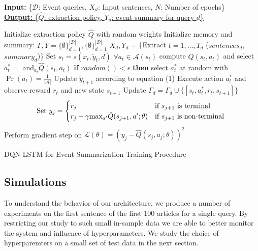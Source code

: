 \documentclass[12pt]{article}
\begin{document}
\begin{algorithm}
    \textbf{Input:} { \rm  \{$\mathcal{D}$: Event queries, $X_d$: Input sentences, $N$: Number of epochs\} } \\
    \underline{\textbf{Output:} \rm \{$\hat{Q}$: extraction policy, $\tilde{Y}_d$: event summary for query $d$\} }
\begin{algorithmic}[1]
\vspace{-0.5cm}
\STATE \rm Initialize extraction policy $\hat{Q}$ with random weights
\STATE \rm Initialize memory and summary: $\Gamma, \tilde{Y} =  \{\emptyset \}^{\mathcal{|D|}}_{d=1},  \{\emptyset \}^{\mathcal{|D|}}_{d=1} $
		\STATE $X_{d}, \tilde{Y}_{d}$ = \{Extract $t=1,...,T_d$ ($sentences_d$, $summary_d$)\}
			\STATE Set $s_t = s(x_t, \tilde{y}_t, d)$
			\STATE $ \forall a_t \in \mathcal{A}(s_t)$ \textrm{compute} $\hat{Q}(s_t, a_t)$ and select $a^{*}_t =$ and$_{a_{t}}\hat{Q}(s_t, a_t)$
			\STATE  \textbf{if} $random() < \epsilon$ \textbf{then} select $a^{*}_t $ at random with $\Pr(a_t) =\frac{1}{| \mathcal{A} |} $
			\STATE Update $\tilde{y}_{t+1}$ according to equation (1)
			\STATE Execute action $a^{*}_t$ and observe reward $r_t$ and new state $s_{t+1}$
			\STATE Update $\Gamma_d = \Gamma_d \cup \{ [s_t, a^{*}_t, r_t, s_{t+1}]\}$
		\ENDFOR
	\ENDFOR
			\STATE \[\textrm{Set } y_j =
					\begin{cases}
						r_j              								& \text{if $s_{j+1}$ is terminal } \\
					     	r_j + \gamma $max$_{a'}\hat{Q}(s_{j+1}, a'; \theta) 	& \text{if $s_{j+1}$ is non-terminal } 
					\end{cases} 
					\]
        			\STATE Perform gradient step on $\mathcal{L}(\theta) = (y_j - \hat{Q}(s_j, a_j; \theta))^2$
		\ENDFOR
\ENDFOR
  \end{algorithmic}
    \caption{DQN-LSTM for Event Summarization Training Procedure}
\end{algorithm}


\subsection{Simulations}
To understand the behavior of our architecture, we produce a number of experiments on the first sentence of the first 100 articles for a single query. By restricting our study to such small in-sample data we are able to better monitor the system and influence of hyperparameters. We study the choice of hyperparemters on a small set of test data in the next section.
\end{document}
